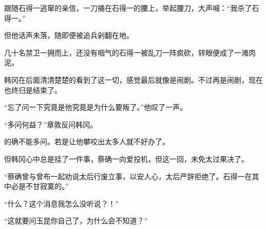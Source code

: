 跟随石得一逃窜的亲信，一刀捅在石得一的腰上，举起腰刀，大声喊：“我杀了石得一。”

但他话声未落，随即便被追兵剁翻在地。

几十名禁卫一拥而上，还没有咽气的石得一被乱刀一阵疯砍，转眼便成了一滩肉泥。

韩冈在后面清清楚楚的看到了这一切，感觉最后就像是闹剧。不过再是闹剧，现在也终归是结束了。

“忘了问一下究竟是他究竟是为什么要叛了。”他叹了一声。

“多问何益？”章敦反问韩冈。

的确不能多问。若是让他攀咬出太多人就不好办了。

但韩冈心中总是挂了一件事，蔡确一向爱投机，但这一回，未免太过果决了。

“蔡确曾与曾布一起劝说太后行废立事，以安人心，太后严辞拒绝了。石得一在其中必是不甘寂寞的。”

“什么？这个消息我怎么没听说？！”

“这就要问玉昆你自己了，为什么会不知道？”

